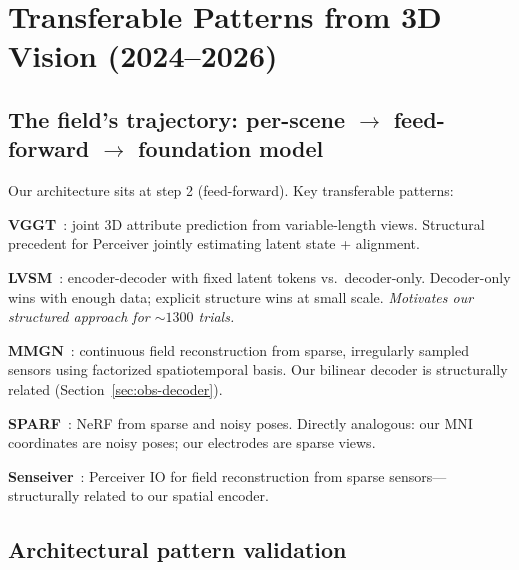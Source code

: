 \documentclass[11pt,letterpaper]{article}
\begin{document}
\section{Transferable Patterns from 3D Vision (2024--2026)}

\subsection{The field's trajectory: per-scene \texorpdfstring{$\to$}{to} feed-forward \texorpdfstring{$\to$}{to} foundation model}

Our architecture sits at step 2 (feed-forward). Key transferable patterns:

\textbf{VGGT}~\cite{wang2025}: joint 3D attribute prediction from variable-length views. Structural precedent for Perceiver jointly estimating latent state + alignment.

\textbf{LVSM}~\cite{jin2024}: encoder-decoder with fixed latent tokens vs.\ decoder-only. Decoder-only wins with enough data; explicit structure wins at small scale. \textit{Motivates our structured approach for ${\sim}1300$ trials.}

\textbf{MMGN}~\cite{xiong2024}: continuous field reconstruction from sparse, irregularly sampled sensors using factorized spatiotemporal basis. Our bilinear decoder is structurally related (Section~\ref{sec:obs-decoder}).

\textbf{SPARF}~\cite{truong2023}: NeRF from sparse and noisy poses. Directly analogous: our MNI coordinates are noisy poses; our electrodes are sparse views.

\textbf{Senseiver}~\cite{jha2023}: Perceiver IO for field reconstruction from sparse sensors---structurally related to our spatial encoder.

\subsection{Architectural pattern validation}
\end{document}
